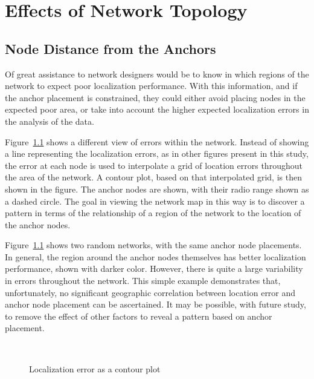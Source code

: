 \chapter{Effects of Network Topology}

\section{Node Distance from the Anchors}

Of great assistance to network designers would be to know in which regions of the network to expect poor localization performance.  With this information, and if the anchor placement is constrained, they could either avoid placing nodes in the expected poor area, or take into account the higher expected localization errors in the analysis of the data.

Figure~\ref{fig:AS6goodcontour} shows a different view of errors within the network. Instead of showing a line representing the localization errors, as in other figures present in this study, the error at each node is used to interpolate a grid of location errors throughout the area of the network.  A contour plot, based on that interpolated grid, is then shown in the figure.  The anchor nodes are shown, with their radio range shown as a dashed circle.  The goal in viewing the network map in this way is to discover a pattern in terms of the relationship of a region of the network to the location of the anchor nodes.  

Figure~\ref{fig:AS6goodcontour} shows two random networks, with the same anchor node placements. In general, the region around the anchor nodes themselves has better localization performance, shown with darker color.  However, there is quite a large variability in errors throughout the network.  This simple example demonstrates that, unfortunately, no significant geographic correlation between location error and anchor node placement can be ascertained.  It may be possible, with future study, to remove the effect of other factors to reveal a pattern based on anchor placement.

\begin{figure}
  \centering
	\\
	\caption{Localization error as a contour plot}
	\label{fig:AS6goodcontour}
\end{figure}

